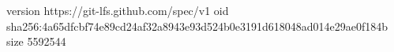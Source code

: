version https://git-lfs.github.com/spec/v1
oid sha256:4a65dfcbf74e89cd24af32a8943e93d524b0e3191d618048ad014e29ae0f184b
size 5592544
